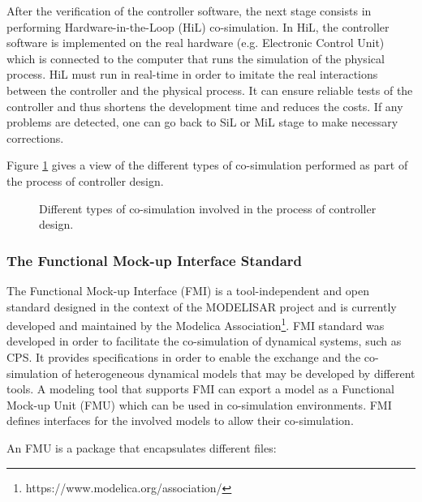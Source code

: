 After the verification of the controller software, the next stage consists in performing Hardware-in-the-Loop (HiL) co-simulation. In HiL, the controller software is implemented on the real hardware (e.g. Electronic Control Unit) which is connected to the computer that runs the simulation of the physical process. HiL must run in real-time in order to imitate the real interactions between the controller and the physical process. It can ensure reliable tests of the controller and thus shortens the development time and reduces the costs. If any problems are detected, one can go back to SiL or MiL stage to make necessary corrections.

Figure \ref{fig:mbd} gives a view of the different types of co-simulation performed as part of the process of controller design.

\begin{figure}[phbt]
\centering

\caption{Different types of co-simulation involved in the process of controller design.}
\label{fig:mbd}
\end{figure}


\subsubsection{The Functional Mock-up Interface Standard}

The Functional Mock-up Interface (FMI) is a tool-independent and open standard designed in the context of the MODELISAR project and is currently developed and maintained by the Modelica Association\footnote{https://www.modelica.org/association/}. FMI standard was developed in order to facilitate the co-simulation of dynamical systems, such as CPS. It provides specifications in order to enable the exchange and the co-simulation of heterogeneous dynamical models that may be developed by different tools. A modeling tool that supports FMI can export a model as a Functional Mock-up Unit (FMU) which can be used in co-simulation environments. FMI defines interfaces for the involved models to allow their co-simulation.



An FMU is a package that encapsulates different files:

